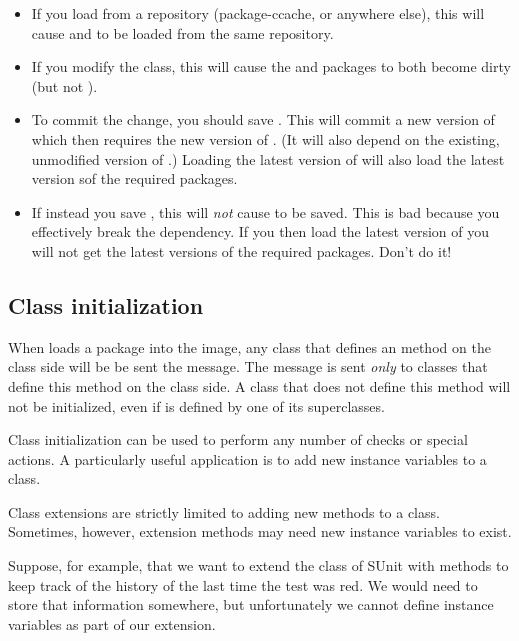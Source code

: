 \documentclass[a4paper,10pt,twoside]{book}
\begin{document}
\begin{itemize}
\item If you load  from a repository (package-ccache, or anywhere else), this will cause  and  to be loaded from the same repository.
\item If you modify the  class, this will cause the  and  packages to both become dirty (but not ).
\item To commit the change, you should save . This will commit a new version of  which then requires the new version of . (It will also depend on the existing, unmodified version of .)  Loading the latest version of  will also load the latest version sof the required packages.
\item If instead you save , this will \emph{not} cause  to be saved.  This is bad because you effectively break the dependency.  If you then load the latest version of  you will not get the latest versions of the required packages. Don't do it!
\end{itemize}

\subsection{Class initialization}

When \MC loads a package into the image, any class that defines an  method on the class side will be be sent the  message. The message is sent \emph{only} to classes that define this method on the class side. A class that does not define this method will not be initialized, even if  is defined by one of its superclasses.


Class initialization can be used to perform any number of checks or special actions.
A particularly useful application is to add new instance variables to a class.

Class extensions are strictly limited to adding new methods to a class.
Sometimes, however, extension methods may need new instance variables to exist.

Suppose, for example, that we want to extend the  class of SUnit with methods to keep track of the history of the last time the test was red.  We would need to store that information somewhere, but unfortunately we cannot define instance variables as part of our extension.
\end{document}
